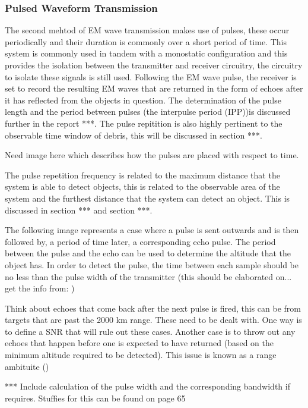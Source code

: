 \documentclass[11pt]{witseiepaper}
\begin{document}
\subsubsection{Pulsed Waveform Transmission} \label{sec:PulsedWaveformTransmission}

The second mehtod of EM wave transmission makes use of pulses, these occur periodically and their duration is commonly over a short period of time. This system is commonly used in tandem with a monostatic configuration and this provides the isolation between the transmitter and receiver circuitry, the circuitry to isolate these signals is still used.
Following the EM wave pulse, the receiver is set to record the resulting EM waves that are returned in the form of echoes after it has reflected from the objects in question. The determination of the pulse length and the period between pulses (the interpulse period (IPP))is discussed further in the report ***. The pulse repitition is also highly pertinent to the observable time window of debris, this will be discussed in section ***.

Need image here which describes how the pulses are placed with respect to time.

The pulse repetition frequency is related to the maximum distance that the system is able to detect objects, this is related to the observable area of the system and the furthest distance that the system can detect an object. This is discussed in section *** and section ***.

The following image represents a case where a pulse is sent outwards and is then followed by, a period of time later, a corresponding echo pulse.
The period between the pulse and the echo can be used to determine the altitude that the object has.
In order to detect the pulse, the time between each sample should be no less than the pulse width of the transmitter (this should be elaborated on... get the info from: \cite[p.~21]{radarHandbook})

Think about echoes that come back after the next pulse is fired, this can be from targets that are past the 2000 km range. These need to be dealt with. One way is to define a SNR that will rule out these cases. Another case is to throw out any echoes that happen before one is expected to have returned (based on the minimum altitude required to be detected). 
This issue is known as a range ambituite (\cite[p~.22]{radarHandbook})

*** Include calculation of the pulse width and the corresponding bandwidth if requires. Stuffies for this can be found on page 65
\end{document}
